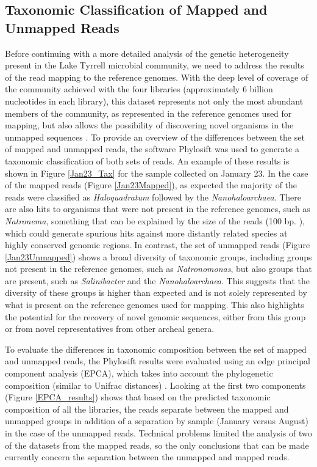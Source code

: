 \clearpage
\subsection{Taxonomic Classification of Mapped and Unmapped Reads}

Before continuing with a more detailed analysis of the genetic heterogeneity present in the Lake Tyrrell microbial community, we need to address the results of the read mapping to the reference genomes. With the deep level of coverage of the community achieved with the four libraries (approximately 6 billion nucleotides in each library), this dataset represents not only the most abundant members of the community, as represented in the reference genomes used for mapping, but also allows the possibility of discovering novel organisms in the unmapped sequences \cite{Narasingarao:2012kp,Albertsen:2013gpa}. To provide an overview of the differences between the set of mapped and unmapped reads, the software Phylosift  \cite{Darling:2014ej} was used to generate a taxonomic classification of both sets of reads. An example of these results is shown in Figure \ref{Jan23_Tax} for the sample collected on January 23. In the case of the mapped reads (Figure \ref{Jan23Mapped}), as expected the majority of the reads were classified as \textit{Haloquadratum} followed by the \textit{Nanohaloarchaea}. There are also hits to organisms that were not present in the reference genomes, such as \textit{Natronema}, something that can be explained by the size of the reads (100 bp. ), which could generate spurious hits against more distantly related species at highly conserved genomic regions. In contrast, the set of unmapped reads (Figure \ref{Jan23Unmapped}) shows a broad diversity of taxonomic groups, including groups not present in the reference genomes, such as \textit{Natronomonas}, but also groups that are present, such as \textit{Salinibacter} and the \textit{Nanohaloarchaea}. This suggests that the diversity of these groups is higher than expected and is not solely represented by what is present on the reference genomes used for mapping. This also highlights the potential for the recovery of novel genomic sequences, either from this group or from novel representatives from other archeal genera.

To evaluate the differences in taxonomic composition between the set of mapped and unmapped reads, the Phylosift results were evaluated using an edge principal component analysis (EPCA), which takes into account the phylogenetic composition (similar to Unifrac distances) \cite{Matsen:2011wn}. Looking at the first two components (Figure \ref{EPCA_results}) shows that based on the predicted taxonomic composition of all the libraries, the reads separate between the mapped and unmapped groups in addition of a separation by sample (January versus August) in the case of the unmapped reads. Technical problems limited the analysis of two of the datasets from the mapped reads, so the only conclusions that can be made currently concern the separation between the unmapped and mapped reads.

